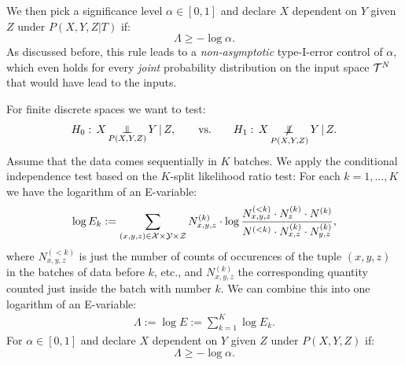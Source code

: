 We then pick a significance level $\alpha \in [0,1]$ and declare $X$ dependent on $Y$ given $Z$ under $P(X,Y,Z|T)$ if:
\[ \Lambda \ge - \log \alpha.  \]
As discussed before, this rule leads to a \emph{non-asymptotic} type-I-error control of $\alpha$, 
which even holds for every \emph{joint} probability distribution on the input space $\mathcal{T}^N$ that would have lead to the inputs.


For finite discrete spaces we want to test:
\[ H_0:\, X \operatorname*{\perp\mkern-11mu\perp}_{P(X,Y,Z)} Y \operatorname*{|} Z, \qquad \text{vs.} \qquad H_1:\,X \operatorname*{\not\mkern-2mu\perp\mkern-11mu\perp}_{P(X,Y,Z)} Y \operatorname*{|} Z. \]
Assume that the data comes sequentially in $K$ batches.
We apply the conditional independence test based on the $K$-split likelihood ratio test:
For each $k=1,\dots,K$ we have the logarithm of an E-variable:
\begin{align*}
     \log E_k := \sum_{(x,y,z) \in \mathcal{X}\times\mathcal{Y}\times\mathcal{Z}}  N^{(k)}_{x,y,z} \cdot  \log \frac{N_{x,y,z}^{(<k)} \cdot N_z^{(k)} \cdot N^{(k)}}{N^{(<k)} \cdot N_{x,z}^{(k)} \cdot N_{y,z}^{(k)}},
\end{align*}
where $N_{x,y,z}^{(<k)}$ is just the number of counts of occurences of the tuple $(x,y,z)$ in the batches of data before $k$, etc., and $N_{x,y,z}^{(k)}$ the corresponding quantity counted just inside the batch with number $k$.
We can combine this into one logarithm of an E-variable:
\begin{align*}
    \Lambda := \log E :=  \sum_{k=1}^K \log E_k.
\end{align*}
For $\alpha \in [0,1]$ and declare $X$ dependent on $Y$ given $Z$ under $P(X,Y,Z)$ if:
\[ \Lambda \ge - \log \alpha.  \]


